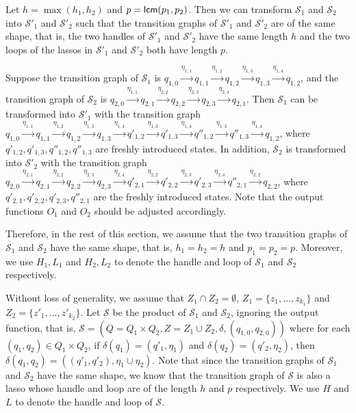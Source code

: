\documentclass[runningheads,a4paper]{llncs}
\newcommand\Ss{\mathcal{S}}
\begin{document}
Let $h=\max(h_1,h_2)$ and $p = {\sf lcm}(p_1, p_2)$. Then we can transform $\Ss_1$ and $\Ss_2$ into $\Ss'_1$ and $\Ss'_2$ such that the transition graphs of $\Ss'_1$ and $\Ss'_2$ are of the same shape, that is, the two handles of $\Ss'_1$ and $\Ss'_2$ have the same length $h$ and the two loops of the lassos in $\Ss'_1$ and $\Ss'_2$ both have length $p$.

\begin{example}
Suppose the transition graph of $\Ss_1$ is $q_{1,0} \xrightarrow{\eta_{1,1}} q_{1, 1}  \xrightarrow{\eta_{1,2}} q_{1, 2} \xrightarrow{\eta_{1, 3}} q_{1, 3} \xrightarrow{\eta_{1, 4}} q_{1, 2}$, and the transition graph of $\Ss_2$ is 
$q_{2,0} \xrightarrow{\eta_{1,1}} q_{2, 1}  \xrightarrow{\eta_{2,2}} q_{2, 2} \xrightarrow{\eta_{2, 3}} q_{2, 3} \xrightarrow{\eta_{2, 4}} q_{2, 1}$. Then $\Ss_1$ can be transformed into $\Ss'_1$ with the transition graph $q_{1,0} \xrightarrow{\eta_{1,1}} q_{1, 1}  \xrightarrow{\eta_{1,2}} q_{1, 2} \xrightarrow{\eta_{1, 3}} q_{1, 3} \xrightarrow{\eta_{1, 4}} q'_{1, 2} \xrightarrow{\eta_{1, 3}} q'_{1, 3} \xrightarrow{\eta_{1, 4}} q''_{1, 2}  \xrightarrow{\eta_{1, 3}} q''_{1, 3} \xrightarrow{\eta_{1, 4}} q_{1, 2}$, where $q'_{1,2}, q'_{1, 3}, q''_{1, 2}, q''_{1, 3}$ are freshly introduced states. In addition, $\Ss_2$ is transformed into $\Ss'_2$ with the transition graph $q_{2,0} \xrightarrow{\eta_{2,1}} q_{2, 1}  \xrightarrow{\eta_{2,2}} q_{2, 2} \xrightarrow{\eta_{2, 3}} q_{2, 3} \xrightarrow{\eta_{2, 4}} q'_{2, 1} \xrightarrow{\eta_{2, 2}} q'_{2, 2} \xrightarrow{\eta_{2, 3}} q'_{2, 3}  \xrightarrow{\eta_{2, 4}} q''_{2, 1} \xrightarrow{\eta_{2, 2}} q_{2, 2}$, where $q'_{2,1}, q'_{2,2}, q'_{2,3}, q''_{2,1}$ are the freshly introduced states. Note that the output functions $O_1$  and $O_2$ should be adjusted accordingly.
\end{example}

Therefore, in the rest of this section, we assume that the two transition graphs of $\Ss_1$ and $\Ss_2$ have the same shape, that is, $h_1 = h_2 = h$ and $p_1 = p_2 = p$. Moreover, we use $H_1, L_1$ and $H_2,L_2$ to denote the handle and loop of $\Ss_1$ and $\Ss_2$ respectively.

Without loss of generality, we assume that $Z_1 \cap Z_2 = \emptyset$, $Z_1 = \{z_1, \dots, z_{k_1}\}$ and $Z_2 = \{z'_1,\dots, z'_{k_2}\}$. Let $\Ss$ be the product of $\Ss_1$ and $\Ss_2$, ignoring the output function, that is, $\Ss=(Q= Q_1 \times Q_2, Z= Z_1 \cup Z_2, \delta, (q_{1,0}, q_{2,0}))$ where for each $(q_1,q_2) \in Q_1 \times Q_2$, if $\delta(q_1)=(q'_1,\eta_1)$ and $\delta(q_2)=(q'_2, \eta_2)$, then $\delta(q_1, q_2)=((q'_1,q'_2), \eta_1 \cup \eta_2)$. Note that since the transition graphs of $\Ss_1$ and $\Ss_2$ have the same shape, we know that the transition graph of $\Ss$ is also a lasso whose handle and loop are of the length $h$ and $p$ respectively. We use $H$ and $L$ to denote the handle and loop of $\Ss$.
\end{document}
